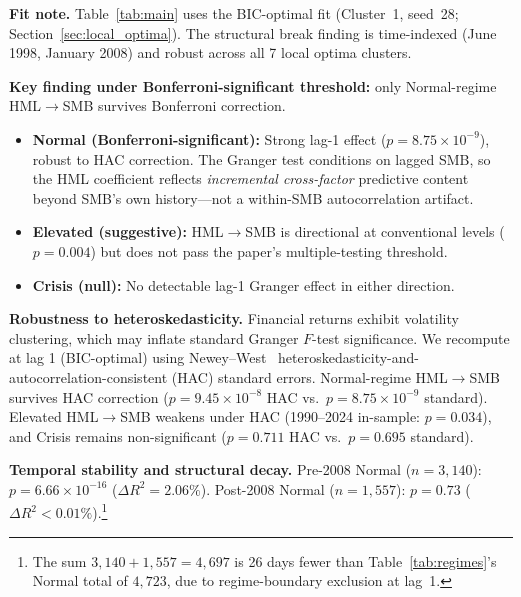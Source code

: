 \documentclass[sigconf,anonymous]{acmart}
\begin{document}
\textbf{Fit note.} Table~\ref{tab:main} uses the BIC-optimal fit (Cluster~1, seed~28; Section~\ref{sec:local_optima}). The structural break finding is time-indexed (June 1998, January 2008) and robust across all 7 local optima clusters.

\textbf{Key finding under Bonferroni-significant threshold:} only Normal-regime
HML$\to$SMB survives Bonferroni correction.
\begin{itemize}
    \item \textbf{Normal (Bonferroni-significant):} Strong lag-1 effect
    ($p = 8.75 \times 10^{-9}$), robust to HAC correction. The Granger test conditions
    on lagged SMB, so the HML coefficient reflects \emph{incremental cross-factor}
    predictive content beyond SMB's own history---not a within-SMB autocorrelation artifact.
    \item \textbf{Elevated (suggestive):} HML$\to$SMB is directional at
    conventional levels ($p = 0.004$) but does not pass the paper's
    multiple-testing threshold.
    \item \textbf{Crisis (null):} No detectable lag-1 Granger effect in either
    direction.
\end{itemize}

\textbf{Robustness to heteroskedasticity.}
Financial returns exhibit volatility clustering, which may inflate standard Granger
$F$-test significance. We recompute at lag 1 (BIC-optimal) using Newey--West~\cite{newey1987simple}
heteroskedasticity-and-autocorrelation-consistent (HAC) standard errors.
Normal-regime HML$\to$SMB survives HAC correction
($p = 9.45 \times 10^{-8}$ HAC vs.\ $p = 8.75 \times 10^{-9}$ standard).
Elevated HML$\to$SMB weakens under HAC (1990--2024 in-sample: $p = 0.034$), and Crisis remains
non-significant ($p = 0.711$ HAC vs.\ $p = 0.695$ standard).

\textbf{Temporal stability and structural decay.}
Pre-2008 Normal ($n = 3{,}140$): $p = 6.66 \times 10^{-16}$ ($\Delta R^2 = 2.06\%$).
Post-2008 Normal ($n = 1{,}557$): $p = 0.73$ ($\Delta R^2 < 0.01\%$).\footnote{The
sum $3{,}140 + 1{,}557 = 4{,}697$ is 26 days fewer than Table~\ref{tab:regimes}'s
Normal total of $4{,}723$, due to regime-boundary exclusion at lag~1.}
\end{document}
